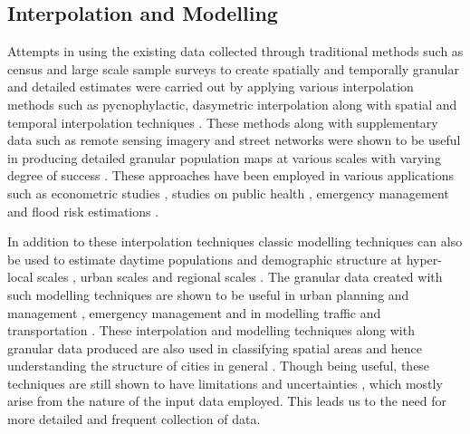 \subsection{Interpolation and Modelling}

Attempts in using the existing data collected through traditional methods such as census and large scale sample surveys to create spatially and temporally granular and detailed estimates were carried out by applying various interpolation methods such as pycnophylactic, dasymetric interpolation \citep{tobler1979, mennis2003, mennis2006, hawley2005, tapp2010, wismans2017} along with spatial \citep{lam1983,martin1989, martin2015} and temporal interpolation techniques \citep{glickman1986}.
These methods along with supplementary data such as remote sensing imagery \citep{sutton2001, chen2002} and street networks \citep{reibel2005} were shown to be useful in producing detailed granular population maps at various scales with varying degree of success \citep{dobson2000, bhaduri2002, dobson2003, bhaduri2005, bhaduri2007}.
These approaches have been employed in various applications such as econometric studies \citep{mcdonald1989}, studies on public health \citep{hay2005}, emergency management \citep{kwan2005} and flood risk estimations \citep{smith2016}.

In addition to these interpolation techniques classic modelling techniques can also be used to estimate daytime populations and demographic structure at hyper-local scales \citep{jochem2013, jia2014}, urban scales \citep{alahmadi2013, abowd2004} and regional scales \citep{foley1954, schmitt1956, singleton2015, mccormack2017}.
The granular data created with such modelling techniques are shown to be useful in urban planning and management \citep{parrott1999}, emergency management \citep{alexander2002, cutter2006} and in modelling traffic and transportation \citep{lefebvre2013}.
These interpolation and modelling techniques along with granular data produced are also used in classifying spatial areas and hence understanding the structure of cities in general \citep{mcmillen2001, mcmillen2004, lee2007, arribas-bel2014}.
Though being useful, these techniques are still shown to have limitations and uncertainties \citep{nagle2014}, which mostly arise from the nature of the input data employed.
This leads us to the need for more detailed and frequent collection of data.

